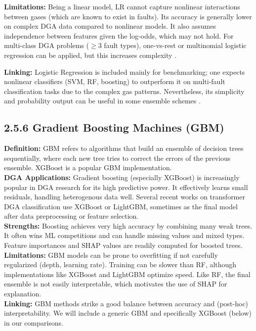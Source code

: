 \textbf{Limitations:} Being a linear model, LR cannot capture nonlinear
interactions between gases (which are known to exist in faults). Its
accuracy is generally lower on complex DGA data compared to nonlinear
models. It also assumes independence between features given the
log-odds, which may not hold. For multi-class DGA problems (\(\geq\)3 fault
types), one-vs-rest or multinomial logistic regression can be applied,
but this increases complexity \parencite{Zhou2024}.

\textbf{Linking:} Logistic Regression is included mainly for
benchmarking; one expects nonlinear classifiers (SVM, RF, boosting) to
outperform it on multi-fault classification tasks due to the complex gas
patterns. Nevertheless, its simplicity and probability output can be
useful in some ensemble schemes \parencite{Wang2023,Kumar2024}.

\subsection{2.5.6 Gradient Boosting Machines
(GBM)}\label{gradient-boosting-machines-gbm}

\textbf{Definition:} GBM refers to algorithms that build an ensemble of
decision trees sequentially, where each new tree tries to correct the
errors of the previous ensemble. XGBoost is a popular GBM
implementation.\\
\textbf{DGA Applications:} Gradient boosting (especially XGBoost) is
increasingly popular in DGA research for its high predictive power. It
effectively learns small residuals, handling heterogenous data well.
Several recent works on transformer DGA classification use XGBoost or
LightGBM, sometimes as the final model after data preprocessing or
feature selection.\\
\textbf{Strengths:} Boosting achieves very high accuracy by combining
many weak trees. It often wins ML competitions and can handle missing
values and mixed types. Feature importances and SHAP values are readily
computed for boosted trees.\\
\textbf{Limitations:} GBM models can be prone to overfitting if not
carefully regularized (depth, learning rate). Training can be slower
than RF, although implementations like XGBoost and LightGBM optimize
speed. Like RF, the final ensemble is not easily interpretable, which
motivates the use of SHAP for explanation.\\
\textbf{Linking:} GBM methods strike a good balance between accuracy and
(post-hoc) interpretability. We will include a generic GBM and
specifically XGBoost (below) in our comparisons.

